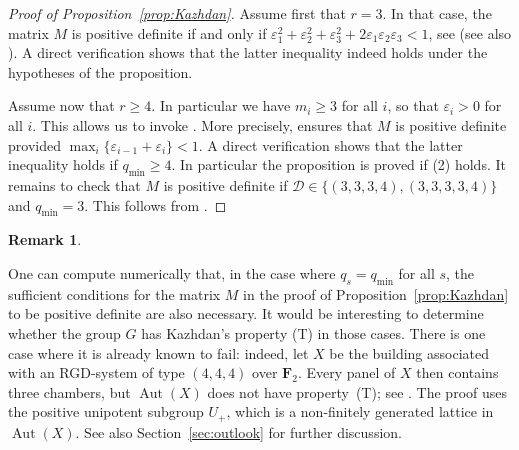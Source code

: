 \documentclass[12pt,a4paper]{amsproc}
\theoremstyle{definition}
\newtheorem{remark}[theorem]{Remark}
\DeclareMathOperator{\Aut}{Aut}
\newcommand{\qmin}{q_{\mathrm{min}}}
\begin{document}
\begin{proof}[Proof of Proposition~\ref{prop:Kazhdan}]
Assume first that  $r=3$. In that case, the matrix $M$   is positive definite if and only if $\varepsilon_1^2+\varepsilon_2^2+\varepsilon_3^2 + 2\varepsilon_1\varepsilon_2\varepsilon_3 < 1$, see \cite[\S4.2]{Ka11} (see also \cite[Theorem~5.9]{EJ}). A direct verification shows that the latter inequality indeed holds under the hypotheses of the proposition. 

Assume now that $r \geq 4$. In particular  we have $m_i \geq 3$ for all $i$, so that $\varepsilon_i >0$ for all $i$. This allows us to invoke  \cite[Proposition~2.5]{CapKas}.  More precisely, \cite[Proposition~2.5(i)]{CapKas} ensures that $M$ is positive definite provided $\max_i \{\varepsilon_{i-1}+ \varepsilon_i\} < 1$. A direct verification shows that the latter inequality holds if $\qmin \geq 4$. In particular the proposition is proved if (2) holds. It remains to check that $M$ is positive definite if $\mathcal D \in \{   (3, 3, 3, 4), (3, 3, 3, 3, 4)\}$ and $\qmin = 3$. This follows from \cite[Proposition 2.5(iii)]{CapKas}.
\end{proof}
	
\begin{remark} \label{rem:lowthickness}

One can compute numerically that, in the case where $q_s = \qmin$ for all $s$, the sufficient conditions for the matrix $M$ in the proof of Proposition~\ref{prop:Kazhdan} to be positive definite are also necessary. It would be interesting to determine whether the group $G$ has Kazhdan's property (T) in those cases. There is one case where it is already known to fail: indeed, let \(X\) be the building associated with an
RGD-system of type \((4,4,4)\) over \(\mathbf F_2\).  Every panel of \(X\)
then contains three chambers, but \(\Aut(X)\) does not have
property~\textup{(T)}; see \cite[Lemma~7.4.6]{BischofThesis}.  The proof uses
the positive unipotent subgroup \(U_+\), which is a non-finitely generated
lattice in \(\Aut(X)\). See also Section~\ref{sec:outlook} for further discussion.
\end{remark}
		
\end{document}
